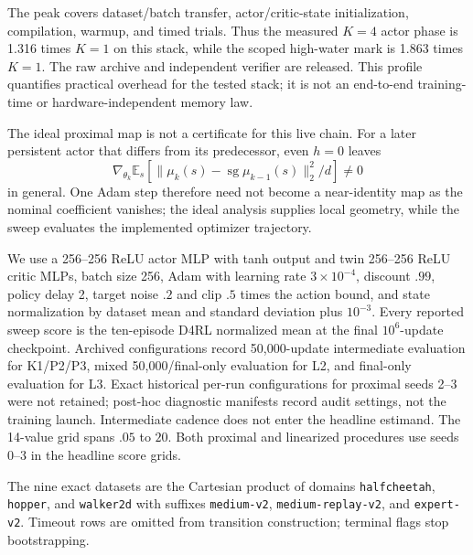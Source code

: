 \documentclass[twoside]{article}
\newcommand{\sg}{\operatorname{sg}}
\begin{document}
The peak covers dataset/batch transfer, actor/critic-state initialization,
compilation, warmup, and timed trials. Thus the measured $K=4$ actor phase is
1.316 times $K=1$ on this stack, while the scoped high-water mark is 1.863
times $K=1$. The raw archive and independent verifier are released. This profile
quantifies practical overhead for the tested stack; it is not an end-to-end
training-time or hardware-independent memory law.

The ideal proximal map is not a certificate for this live chain. For a later
persistent actor that differs from its predecessor, even $h=0$ leaves
\begin{equation}
\nabla_{\theta_k}\mathbb E_s\!
\left[\|\mu_k(s)-\sg\mu_{k-1}(s)\|_2^2/d\right]\ne0
\end{equation}
in general. One Adam step therefore need not become a near-identity map as the
nominal coefficient vanishes; the ideal analysis supplies local geometry, while
the sweep evaluates the implemented optimizer trajectory.

We use a 256--256 ReLU actor MLP with tanh output and twin 256--256 ReLU critic MLPs, batch size 256, Adam with
learning rate $3\times10^{-4}$, discount $.99$, policy delay 2, target noise
$.2$ and clip $.5$ times the action bound, and state normalization by dataset
mean and standard deviation plus $10^{-3}$. Every reported sweep score is the
ten-episode D4RL normalized mean at the final $10^6$-update checkpoint.
Archived configurations record 50,000-update intermediate evaluation for
K1/P2/P3, mixed 50,000/final-only evaluation for L2, and final-only evaluation
for L3. Exact historical per-run configurations for proximal seeds 2--3 were not
retained; post-hoc diagnostic manifests record audit settings, not the
training launch.
Intermediate cadence does not enter the headline estimand. The 14-value grid
spans $.05$ to $20$.
Both proximal and linearized procedures use seeds 0--3 in the headline score grids.

The nine exact datasets are the Cartesian product of domains
\texttt{halfcheetah}, \texttt{hopper}, and \texttt{walker2d} with suffixes
\texttt{medium-v2}, \texttt{medium-replay-v2}, and \texttt{expert-v2}.
Timeout rows are omitted from transition construction; terminal flags stop
bootstrapping.
\end{document}
